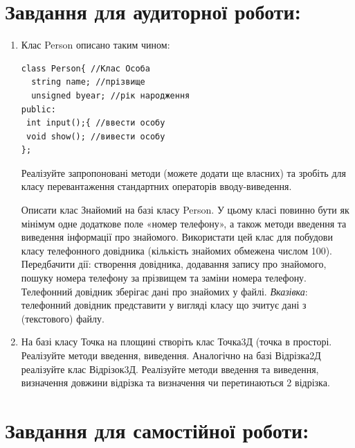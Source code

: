 \documentclass[a5paper,titlepage,openany,twoside,draft]{book_unv}%
\begin{document}
\section{Завдання для аудиторної роботи:}

\begin{enumerate}
\def\labelenumi{\arabic{enumi})}

\item
Клас Person описано таким чином:
\begin{verbatim}
class Person{ //Клас Особа
  string name; //прізвище
  unsigned byear; //рік народження
public:
 int input();{ //ввести особу  
 void show(); //вивести особу
};
\end{verbatim}

Реалізуйте запропоновані методи (можете додати ще власних) та зробіть
для класу перевантаження стандартних операторів вводу-виведення.

Описати клас Знайомий на базі класу Person. У цьому класі повинно бути 
як мінімум одне додаткове поле «номер телефону»,
 а також методи введення та виведення інформації про знайомого. 
Використати цей клас для побудови класу телефонного довідника (кількість
знайомих обмежена числом 100). Передбачити дії: створення довідника, додавання запису про знайомого,
пошуку номера телефону за прізвищем та заміни номера телефону. 
Телефонний довідник зберігає дані про знайомих у файлі.
\emph{\emph{Вказівка}}: телефонний довідник представити у вигляді класу
що зчитує дані з (текстового) файлу.

\item
  На базі класу Точка на площині створіть клас Точка3Д (точка
  в просторі. Реалізуйте методи введення, виведення. Аналогічно на базі
  Відрізка2Д реалізуйте клас Відрізок3Д. Реалізуйте методи
  введення та виведення, визначення довжини відрізка та
  визначення чи перетинаються 2 відрізка.

\end{enumerate}

\section{Завдання для самостійної роботи:}
\end{document}
